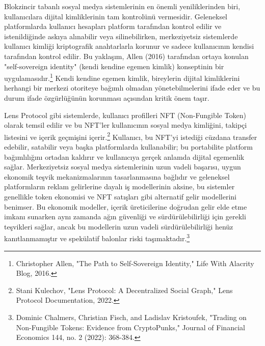 \documentclass[11pt,a4paper]{article}
\begin{document}
Blokzincir tabanlı sosyal medya sistemlerinin en önemli yeniliklerinden biri, kullanıcılara dijital kimliklerinin tam kontrolünü vermesidir. Geleneksel platformlarda kullanıcı hesapları platform tarafından kontrol edilir ve istenildiğinde askıya alınabilir veya silinebilirken, merkeziyetsiz sistemlerde kullanıcı kimliği kriptografik anahtarlarla korunur ve sadece kullanıcının kendisi tarafından kontrol edilir. Bu yaklaşım, Allen (2016) tarafından ortaya konulan "self-sovereign identity" (kendi kendine egemen kimlik) konseptinin bir uygulamasıdır.\footnote{Christopher Allen, "The Path to Self-Sovereign Identity," Life With Alacrity Blog, 2016.} Kendi kendine egemen kimlik, bireylerin dijital kimliklerini herhangi bir merkezi otoriteye bağımlı olmadan yönetebilmelerini ifade eder ve bu durum ifade özgürlüğünün korunması açısından kritik önem taşır.

Lens Protocol gibi sistemlerde, kullanıcı profilleri NFT (Non-Fungible Token) olarak temsil edilir ve bu NFT'ler kullanıcının sosyal medya kimliğini, takipçi listesini ve içerik geçmişini içerir.\footnote{Stani Kulechov, "Lens Protocol: A Decentralized Social Graph," Lens Protocol Documentation, 2022.} Kullanıcı, bu NFT'yi istediği cüzdana transfer edebilir, satabilir veya başka platformlarda kullanabilir; bu portabilite platform bağımlılığını ortadan kaldırır ve kullanıcıya gerçek anlamda dijital egemenlik sağlar. Merkeziyetsiz sosyal medya sistemlerinin uzun vadeli başarısı, uygun ekonomik teşvik mekanizmalarının tasarlanmasına bağlıdır ve geleneksel platformların reklam gelirlerine dayalı iş modellerinin aksine, bu sistemler genellikle token ekonomisi ve NFT satışları gibi alternatif gelir modellerini benimser. Bu ekonomik modeller, içerik üreticilerine doğrudan gelir elde etme imkanı sunarken aynı zamanda ağın güvenliği ve sürdürülebilirliği için gerekli teşvikleri sağlar, ancak bu modellerin uzun vadeli sürdürülebilirliği henüz kanıtlanmamıştır ve spekülatif balonlar riski taşımaktadır.\footnote{Dominic Chalmers, Christian Fisch, and Ladislav Kristoufek, "Trading on Non-Fungible Tokens: Evidence from CryptoPunks," Journal of Financial Economics 144, no. 2 (2022): 368-384.}
\end{document}
